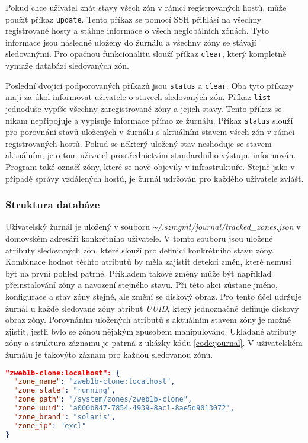 Pokud chce uživatel znát stavy všech zón v rámci registrovaných hostů, může použít příkaz \verb|update|. Tento příkaz se pomocí
SSH přihlásí na všechny registrované hosty a stáhne informace o všech neglobálních zónách.  Tyto informace jsou následně uloženy
do žurnálu a všechny zóny se stávají sledovanými. Pro opačnou funkcionalitu slouží příkaz \verb|clear|, který kompletně vymaže
databázi sledovaných zón.

Poslední dvojicí podporovaných příkazů jsou \verb|status| a \verb|clear|. Oba tyto příkazy mají za úkol informovat uživatele
o stavech sledovaných zón. Příkaz \verb|list| jednoduše vypíše všechny zaregistrované zóny a jejich stavy. Tento příkaz se nikam
nepřipojuje a vypisuje informace přímo ze žurnálu. Příkaz \verb|status| slouží pro porovnání stavů uložených v žurnálu s 
aktuálním stavem všech zón v rámci registrovaných hostů. Pokud se některý uložený stav neshoduje se stavem aktuálním, je 
o tom uživatel prostřednictvím standardního výstupu informován. Program také označí zóny, které se nově objevily v infrastruktuře. 
Stejně jako v případě správy vzdálených hostů, je žurnál udržován pro každého uživatele zvlášť. 
\subsubsection{Struktura databáze}
\label{chapter:implementation:client:journal:database}
Uživatelský žurnál je uložený v souboru \textit{\textasciitilde/.szmgmt/journal/tracked\_zones.json} v domovském adresáři
konkrétního uživatele. V tomto souboru jsou uložené atributy sledovaných zón, které slouží pro definici konkrétního stavu zóny.
Kombinace hodnot těchto atributů by měla zajistit detekci změn, které nemusí být na první pohled patrné. Příkladem takové změny
může být například přeinstalování zóny a navození stejného stavu. Při této akci zůstane jméno, konfigurace a stav zóny stejné,
ale změní se diskový obraz. Pro tento účel udržuje žurnál u každé sledované zóny atribut \textit{UUID}, který jednoznačně
definuje diskový obraz zóny. Porovnáním uložených atributů s aktuálním stavem zóny je možné zjistit, jestli bylo se zónou 
nějakým způsobem manipulováno. Ukládané atributy zóny a struktura záznamu je patrná z ukázky kódu \ref{code:journal}. V 
uživatelském žurnálu je takovýto záznam pro každou sledovanou zónu.
\begin{lstlisting}[language=json, caption={Záznam stavu zóny v žurnálu}, float,label={code:journal}]  
"zweb1b-clone:localhost": {
  "zone_name": "zweb1b-clone:localhost",
  "zone_state": "running",
  "zone_path": "/system/zones/zweb1b-clone",
  "zone_uuid": "a000b847-7854-4939-8ac1-8ae5d9013072",
  "zone_brand": "solaris",
  "zone_ip": "excl"
}
\end{lstlisting}
